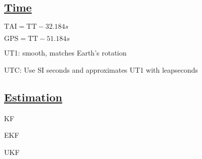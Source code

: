 \documentclass[11pt,landscape]{article}
\begin{document}
\newpage
\subsection{\underline{Time}}

$\text{TAI} = \text{TT} - 32.184s$

$\text{GPS} = \text{TT} - 51.184s$

UT1: smooth, matches Earth's rotation

UTC: Use SI seconds and approximates UT1 with leapseconds


\newpage
\subsection{\underline{Estimation}}

KF

EKF

UKF

\scriptsize


\end{document}

